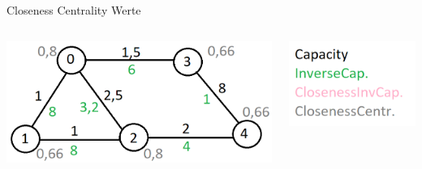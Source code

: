 \documentclass[aspectratio=169,10pt]{beamer}
\begin{document}
\begin{frame}{Closeness Centrality Werte}
\begin{columns}
\begin{column}[t]{0.7\paperwidth}
\includegraphics[width=\textwidth]{images/kai3.png}
\end{column}
\begin{column}[t]{0.3\paperwidth}
\includegraphics[width=\textwidth]{images/kai_legend.png}
\end{column}
\end{columns}
\end{frame}
\end{document}

